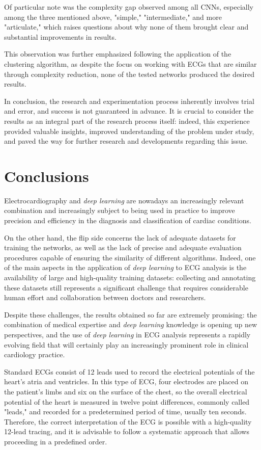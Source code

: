 \documentclass[12pt,english]{report}
\begin{document}
Of particular note was the complexity gap observed among all CNNs, especially among the three mentioned above, "simple," "intermediate," and more "articulate," which raises questions about why none of them brought clear and substantial improvements in results.

This observation was further emphasized following the application of the clustering algorithm, as despite the focus on working with ECGs that are similar through complexity reduction, none of the tested networks produced the desired results.

In conclusion, the research and experimentation process inherently involves trial and error, and success is not guaranteed in advance. It is crucial to consider the results as an integral part of the research process itself: indeed, this experience provided valuable insights, improved understanding of the problem under study, and paved the way for further research and developments regarding this issue.

\chapter{Conclusions}
\label{chap:conclusions}

Electrocardiography and \textit{deep learning} are nowadays an increasingly relevant combination and increasingly subject to being used in practice to improve precision and efficiency in the diagnosis and classification of cardiac conditions.

On the other hand, the flip side concerns the lack of adequate datasets for training the networks, as well as the lack of precise and adequate evaluation procedures capable of ensuring the similarity of different algorithms. Indeed, one of the main aspects in the application of \textit{deep learning} to ECG analysis is the availability of large and high-quality training datasets: collecting and annotating these datasets still represents a significant challenge that requires considerable human effort and collaboration between doctors and researchers.

Despite these challenges, the results obtained so far are extremely promising: the combination of medical expertise and \textit{deep learning} knowledge is opening up new perspectives, and the use of \textit{deep learning} in ECG analysis represents a rapidly evolving field that will certainly play an increasingly prominent role in clinical cardiology practice.

Standard ECGs consist of 12 leads used to record the electrical potentials of the heart's atria and ventricles. In this type of ECG, four electrodes are placed on the patient's limbs and six on the surface of the chest, so the overall electrical potential of the heart is measured in twelve point differences, commonly called "leads," and recorded for a predetermined period of time, usually ten seconds. Therefore, the correct interpretation of the ECG is possible with a high-quality 12-lead tracing, and it is advisable to follow a systematic approach that allows proceeding in a predefined order.
\end{document}
